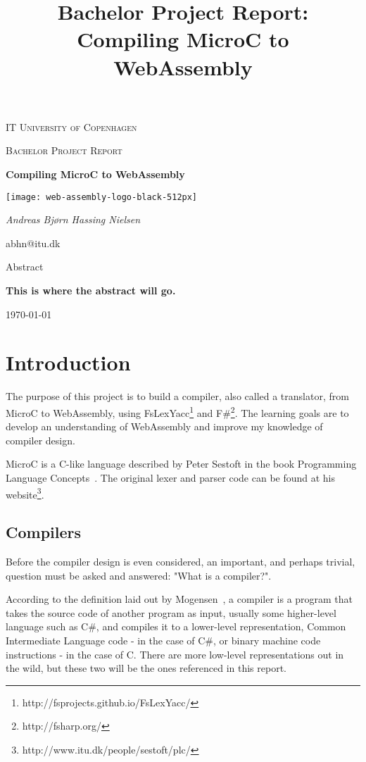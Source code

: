 \documentclass[a4paper]{article}
\title{Bachelor Project Report: Compiling MicroC to WebAssembly}
\begin{document}
\begin{titlepage}
	\centering
	{\scshape\LARGE IT University of Copenhagen \par}
	\vspace{1cm}
	{\scshape\Large Bachelor Project Report\par}
	\vspace{1.5cm}
	{\huge\bfseries Compiling MicroC to WebAssembly \par}
	\vspace{2cm}
	{\texttt{[image: web-assembly-logo-black-512px]} \par}
	\vspace{2cm}
	{\Large\itshape Andreas Bjørn Hassing Nielsen\par}
	abhn@itu.dk\\
	\vspace{2cm}
	{\Large Abstract\par}
	{\bfseries This is where the abstract will go.}
	\vfill
	{\large \today\par}
\end{titlepage}

\newpage

\tableofcontents
\newpage


\section{Introduction}
The purpose of this project is to build a compiler, also called a translator, from MicroC to WebAssembly, using FsLexYacc\footnote{\label{footnote:fslexyacc-url}http://fsprojects.github.io/FsLexYacc/} and F\#\footnote{http://fsharp.org/}. The learning goals are to develop an understanding of WebAssembly and improve my knowledge of compiler design.

MicroC is a C-like language described by Peter Sestoft in the book Programming Language Concepts~\cite{PLC}. The original lexer and parser code can be found at his website\footnote{http://www.itu.dk/people/sestoft/plc/}.

\subsection{Compilers}
Before the compiler design is even considered, an important, and perhaps trivial, question must be asked and answered: "What is a compiler?".

According to the definition laid out by Mogensen~\cite{BCD}, a compiler is a program that takes the source code of another program as input, usually some higher-level language such as C\#, and compiles it to a lower-level representation, Common Intermediate Language code - in the case of C\#, or binary machine code instructions - in the case of C. There are more low-level representations out in the wild, but these two will be the ones referenced in this report.
\end{document}
